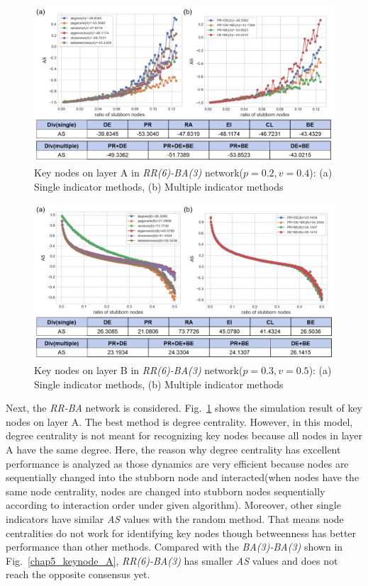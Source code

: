 \begin{figure}[!htb]
	\centering
	\includegraphics[width=\hsize]{figure/chap5_keynode_RR_BA_A.png}
	\caption{Key nodes on layer A in \textit{RR(6)-BA(3)} network($p=0.2, v=0.4$):
		(a) Single indicator methods, (b) Multiple indicator methods}
	\label{chap5_keynode_RR_BA_A}
\end{figure}
\begin{figure}[!htb]
	\centering
	\includegraphics[width=\hsize]{figure/chap5_keynode_RR_BA_B.png}
	\caption{Key nodes on layer B in \textit{RR(6)-BA(3)} network($p=0.3, v=0.5$):
		(a) Single indicator methods, (b) Multiple indicator methods}
	\label{chap5_keynode_RR_BA_B}
\end{figure}

Next, the \textit{RR-BA} network is considered. Fig.~\ref{chap5_keynode_RR_BA_A} shows the simulation result of key nodes on layer A. The best method is degree centrality. However, in this model, degree centrality is not meant for recognizing key nodes because all nodes in layer A have the same degree. Here, the reason why degree centrality has excellent performance is analyzed as those dynamics are very efficient because nodes are sequentially changed into the stubborn node and interacted(when nodes have the same node centrality, nodes are changed into stubborn nodes sequentially according to interaction order under given algorithm). Moreover, other single indicators have similar \textit{AS} values with the random method. That means node centralities do not work for identifying key nodes though betweenness has better performance than other methods. Compared with the \textit{BA(3)-BA(3)} shown in Fig.~\ref{chap5_keynode_A}, \textit{RR(6)-BA(3)} has smaller \textit{AS} values and does not reach the opposite consensus yet. 

